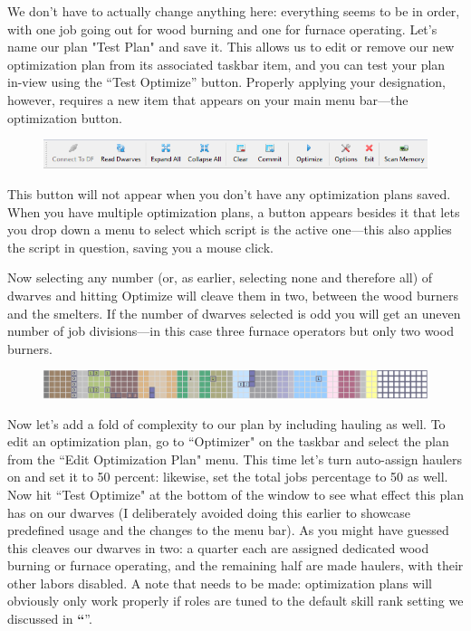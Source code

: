 \documentclass[]{article}
\newcommand{\jump}[1] {\textbf{``\nameref{sec:#1}}''}
\begin{document}
We don't have to actually change anything here: everything seems to be in order, with one job going out
for wood burning and one for furnace operating. Let's name our plan "Test Plan" and save it. This allows
us to edit or remove our new optimization plan from its associated taskbar item, and you can test your
plan in-view using the ``Test Optimize'' button. Properly applying your designation, however,
requires a new item that appears on your main menu bar---the optimization button.

\begin{figure}[h!] \centering \includegraphics[width=\linewidth]{Sec4Fig8}
\end{figure}

This button will not appear when you don't have any optimization plans saved. When you have multiple
optimization plans, a button appears besides it that lets you drop down a menu to select which script is
the active one---this also applies the script in question, saving you a mouse click.

Now selecting any number (or, as earlier, selecting none and therefore all) of dwarves and
hitting Optimize will cleave them in two, between the wood burners and the smelters. If the number of
dwarves selected is odd you will get an uneven number of job divisions---in this case three furnace
operators but only two wood burners.

\begin{figure}[h!]
\centering
\includegraphics[width=\linewidth]{Sec4Fig10}
\end{figure}

Now let's add a fold of complexity to our plan by including hauling as well. To edit an optimization
plan, go to ``Optimizer" on the taskbar and select the plan from the ``Edit Optimization Plan" menu. This
time let's turn auto-assign haulers on and set it to 50 percent: likewise, set the total jobs percentage
to 50 as well. Now hit ``Test Optimize" at the bottom of the window to see what effect this plan has on
our dwarves (I deliberately avoided doing this earlier to showcase predefined usage and the changes to
the menu bar). As you might have guessed this cleaves our dwarves in two: a quarter each are assigned
dedicated wood burning or furnace operating, and the remaining half are made haulers, with their other
labors disabled. A note that needs to be made: optimization plans will obviously only work properly if
roles are tuned to the default skill rank setting we discussed in \jump{Roles}.
\end{document}
